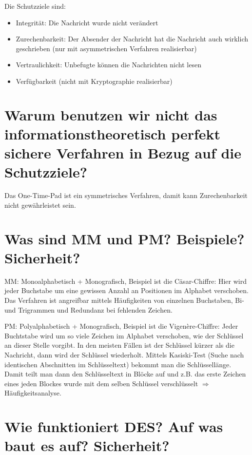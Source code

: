 \documentclass{article}
\begin{document}
	Die Schutzziele sind:
	\begin{itemize}
		\item Integrität: Die Nachricht wurde nicht verändert
		\item Zurechenbarkeit: Der Absender der Nachricht hat die Nachricht auch wirklich geschrieben (nur mit asymmetrischen Verfahren realisierbar)
		\item Vertraulichkeit: Unbefugte können die Nachrichten nicht lesen
		\item Verfügbarkeit (nicht mit Kryptographie realisierbar)
	\end{itemize}
	
	\section*{Warum benutzen wir nicht das informationstheoretisch perfekt sichere Verfahren in Bezug auf die Schutzziele?}
	
	Das One-Time-Pad ist ein symmetrisches Verfahren, damit kann Zurechenbarkeit nicht gewährleistet sein.
	
	\section*{Was sind MM und PM? Beispiele? Sicherheit?}
	
	MM: Monoalphabetisch + Monografisch, Beispiel ist die Cäsar-Chiffre: Hier wird jeder Buchstabe um eine gewissen Anzahl an Positionen im Alphabet verschoben. Das Verfahren ist angreifbar mittels Häufigkeiten von einzelnen Buchstaben, Bi- und Trigrammen und Redundanz bei fehlenden Zeichen.
	
	PM: Polyalphabetisch + Monografisch, Beispiel ist die Vigenère-Chiffre: Jeder Buchtstabe wird um so viele Zeichen im Alphabet verschoben, wie der Schlüssel an dieser Stelle vorgibt. In den meisten Fällen ist der Schlüssel kürzer als die Nachricht, dann wird der Schlüssel wiederholt. Mittels Kasiski-Test (Suche nach identischen Abschnitten im Schlüsseltext) bekommt man die Schlüssellänge. Damit teilt man dann den Schlüsseltext in Blöcke auf und z.B. das erste Zeichen eines jeden Blockes wurde mit dem selben Schlüssel verschlüsselt $\Rightarrow$ Häufigkeitsanalyse.
	
	\section*{Wie funktioniert DES? Auf was baut es auf? Sicherheit?}
	
\end{document}
